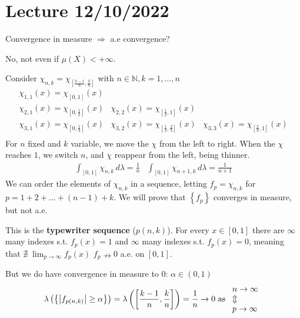 \section{Lecture 12/10/2022}
\begin{remark}
    Convergence in measure \(\Rightarrow\) a.e convergence?

    No, not even if \(\mu(X) < +\infty\).

    Consider \(\chi_{n,k} = \chi_{[\frac{k-1}{n}, \frac{k}{n}]}\) with \(n \in \mathbb{N}, k = 1, \ldots, n\)
    \[
        \begin{array}{ccc}
            \chi_{1,1}(x) = \chi_{[0, 1]}(x) & & \\
            \chi_{2,1}(x) = \chi_{[0, \frac{1}{2}]}(x) & \chi_{2,2}(x) = \chi_{[\frac{1}{2}, 1]}(x) & \\
            \chi_{3,1}(x) = \chi_{[0, \frac{1}{3}]}(x) & \chi_{3,2}(x) = \chi_{[\frac{1}{3}, \frac{2}{3}]}(x) &\chi_{3,3}(x) = \chi_{[\frac{2}{3}, 1]}(x) \\
        \end{array}
    \]
    For \(n\) fixed and \(k\) variable, we move the \(\chi\) from the left to right. When the \(\chi\) reaches \(1\), we switch \(n\), and \(\chi\) reappear from the left, being thinner. 
    \[
        \begin{array}{cc}
            \int_{[0,1]} \chi_{n,k} \, d\lambda = \frac{1}{n} & \int_{[0,1]} \chi_{n+1, k} \, d\lambda = \frac{1}{n+1}
        \end{array}
    \]
    We can order the elements of \(\chi_{n,k}\) in a sequence, letting
    \(f_p = \chi_{n,k}\) for \(p=1+2+\ldots+(n-1)+k\). We will prove that \(\left\{ f_p \right\}\) converges in measure, but not a.e. 

    This is the \textbf{typewriter sequence} (\(p(n,k)\)). For every \(x \in [0,1]\) there are \(\infty\) many indexes s.t. \(f_p(x) = 1\) and \(\infty\) many indexes s.t. \(f_p(x) = 0\), meaning that \(\nexists \; \lim_{p\to \infty} f_p(x)\)
    \( f_p \nrightarrow 0 \) a.e. on \(\left[ 0, 1\right]\).

    But we do have convergence in measure to \(0\): \(\alpha \in (0,1)\)
    \[
        \lambda\left(\left\{ \abs{f_{p(n,k)}} \geq \alpha \right\}\right) = \lambda \left(\left[ \frac{k-1}{n}, \frac{k}{n} \right]\right) = \frac{1}{n} \to 0 \mbox{ as } \begin{array}{l}
            n\to \infty \\
            \Updownarrow \\
            p \to \infty        
        \end{array}
    \]
\end{remark}
